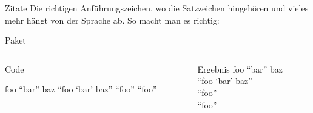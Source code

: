 \begin{frame}[fragile]{Zitate}
  Die richtigen Anführungszeichen, wo die Satzzeichen hingehören und vieles mehr hängt von der Sprache ab.
  So macht man es richtig:
  \begin{block}{Paket}
    \begin{lstverbatim}
    \usepackage[autostyle]{csquotes} %
    \end{lstverbatim}
  \end{block}
  \begin{columns}[onlytextwidth,t]
    \begin{column}{0.60\textwidth}
      \begin{block}{Code}
        \begin{lstverbatim}
        foo \enquote{bar} baz
        \enquote{foo \enquote{bar} baz}
         \enquote{foo}
         \enquote{foo}
        \end{lstverbatim}
      \end{block}
    \end{column}
    \begin{column}{0.36\textwidth}
      \begin{block}{Ergebnis}
        foo \enquote{bar} baz \\
        \enquote{foo \enquote{bar} baz} \\
         \enquote{foo} \\
         \enquote{foo} \\
      \end{block}
    \end{column}
  \end{columns}
\end{frame}
